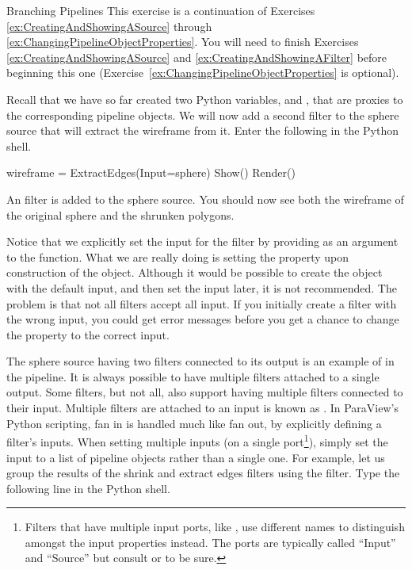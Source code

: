\begin{exercise}{Branching Pipelines}
  \label{ex:BranchingPipelines}%
  This exercise is a continuation of Exercises
  \ref{ex:CreatingAndShowingASource} through
  \ref{ex:ChangingPipelineObjectProperties}.  You will need to finish
  Exercises \ref{ex:CreatingAndShowingASource} and
  \ref{ex:CreatingAndShowingAFilter} before beginning this one
  (Exercise~\ref{ex:ChangingPipelineObjectProperties} is optional).

  Recall that we have so far created two Python variables, 
  and , that are proxies to the corresponding pipeline
  objects.  We will now add a second filter to the sphere source that will
  extract the wireframe from it.  Enter the following in the Python shell.

  \begin{python}
wireframe = ExtractEdges(Input=sphere)
Show()
Render()
  \end{python}

  An  filter is added to the sphere source.  You should
  now see both the wireframe of the original sphere and the shrunken
  polygons.

  Notice that we explicitly set the input for the 
  filter by providing  as an argument to the
   function.  What we are really doing is setting the
   property upon construction of the object.  Although it
  would be possible to create the object with the default input, and then
  set the input later, it is not recommended.  The problem is that not all
  filters accept all input.  If you initially create a filter with the
  wrong input, you could get error messages before you get a chance to
  change the  property to the correct input.

  The sphere source having two filters connected to its output is an
  example of  in the pipeline.  It is always possible to
  have multiple filters attached to a single output.  Some filters, but not
  all, also support having multiple filters connected to their input.
  Multiple filters are attached to an input is known as .
  In ParaView's Python scripting, fan in is handled much like fan out, by
  explicitly defining a filter's inputs.  When setting multiple inputs (on
  a single
  port\footnote{
  Filters that have multiple input ports, like ,
  use different names to distinguish amongst the input properties instead.
  The ports are typically called
  ``Input'' and ``Source'' but consult  or  to be sure.
  }), simply set the input to a list of pipeline objects rather
  than a single one.  For example, let us group the results of the shrink
  and extract edges filters using the  filter.  Type
  the following line in the Python shell.


\end{exercise}
